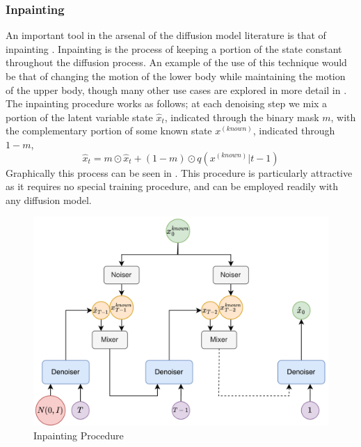 \subsubsection{Inpainting}
\label{sec:diffusion_method_inpainting}

An important tool in the arsenal of the diffusion model literature is that of inpainting \cite{diffusion_inpainting}. Inpainting is the process of keeping a portion of the state constant throughout the diffusion process. An example of the use of this technique would be that of changing the motion of the lower body while maintaining the motion of the upper body, though many other use cases are explored in more detail in . The inpainting procedure works as follows; at each denoising step we mix a portion of the latent variable state $\hat{x}_t$, indicated through the binary mask $m$, with the complementary portion of some known state $x^{(known)}$, indicated through $1-m$, 
\begin{equation}
    \hat{x}_{t} = m \odot \hat{x}_t + (1-m) \odot q(x^{(known)}|t-1)
\end{equation}
Graphically this process can be seen in . This procedure is particularly attractive as it requires no special training procedure, and can be employed readily with any diffusion model.

\begin{figure}[!ht]
    \centering
    \includegraphics[width=1\textwidth]{Figures/diffusion/Inpainting.png}
    \caption{Inpainting Procedure}
    \label{fig:inpainting}
\end{figure}


